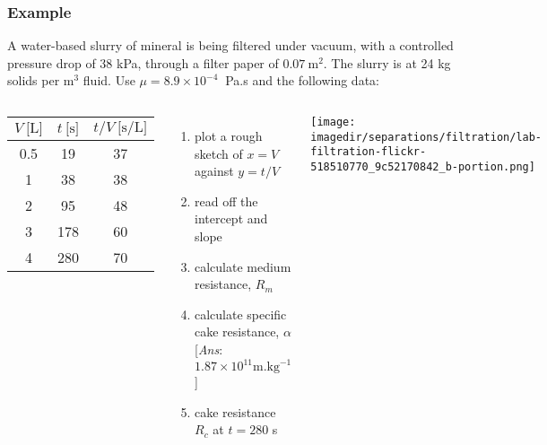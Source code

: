 \begin{frame}\frametitle{Example}
	A water-based slurry of mineral is being filtered under vacuum, with a controlled pressure drop of 38 kPa, through a filter paper of $0.07~\text{m}^2$. The slurry is at 24 kg solids per $\text{m}^3$ fluid. Use $\mu = 8.9 \times 10^{-4}~$ Pa.s and the following data:

	\begin{columns}[t]
			\vspace{-12pt}
			\begin{center}
				\begin{tabular}{c|c||c}
					$V~\text{[L]}$		&	$t~\text{[s]}$  & $t/V~\text{[s/L]}$\\ \hline
					0.5				 	& 	19 & 37\\
					1					& 	38 & 38\\
					2					& 	95 & 48\\
					3					& 	178 & 60\\
					4					&	280 & 70\\ \hline
				\end{tabular}
			\end{center}
			\begin{enumerate}
				\item	plot a rough sketch of $x=V$ against $y=t/V$
				\item	read off the intercept and slope
				\item	calculate medium resistance, $R_m$ 
				\item	calculate specific cake resistance, $\alpha$ {\scriptsize \color{orange}[\emph{Ans}: $1.87 \times 10^{11} \text{m.kg}^{-1}$]}
				\item	cake resistance $R_c$ at $t=280$ s 
			\end{enumerate}
			\begin{center}
				\texttt{[image: \\imagedir/separations/filtration/lab-filtration-flickr-518510770\_9c52170842\_b-portion.png]}
			\end{center}
	\end{columns}
\end{frame}

